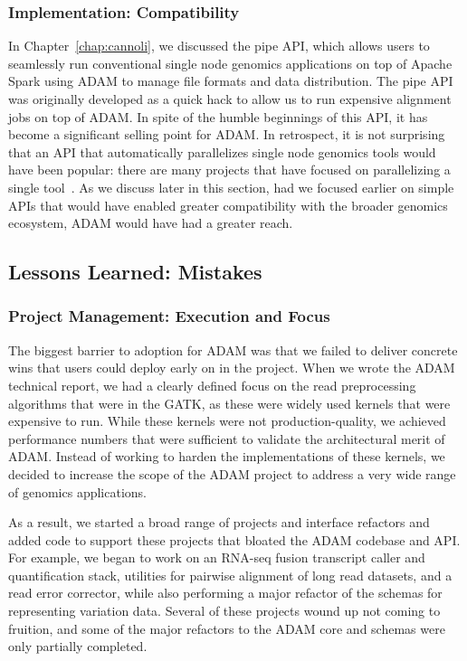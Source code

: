 \documentclass[phd]{ucbthesis}
\begin{document}
\subsubsection{Implementation: Compatibility}
\label{sec:win-compatibility}

In Chapter~\ref{chap:cannoli}, we discussed the pipe API, which allows users to
seamlessly run conventional single node genomics applications on top of Apache
Spark using ADAM to manage file formats and data distribution. The pipe API was
originally developed as a quick hack to allow us to run expensive alignment jobs
on top of ADAM. In spite of the humble beginnings of this API, it has become a
significant selling point for ADAM. In retrospect, it is not surprising that
an API that automatically parallelizes single node genomics tools would have
been popular: there are many projects that have focused on parallelizing a
single tool~\cite{abuin15, decap15, langmead09crossbow, pireddu11, schatz09}.
As we discuss later in this section, had we focused earlier on simple APIs that
would have enabled greater compatibility with the broader genomics ecosystem,
ADAM would have had a greater reach.

\subsection{Lessons Learned: Mistakes}
\label{sec:mistakes}

\subsubsection{Project Management: Execution and Focus}
\label{sec:fail-execution-and-focus}

The biggest barrier to adoption for ADAM was that we failed to deliver concrete
wins that users could deploy early on in the project. When we wrote the ADAM
technical report, we had a clearly defined focus on the read preprocessing
algorithms that were in the GATK, as these were widely used kernels that were
expensive to run. While these kernels were not production-quality, we achieved
performance numbers that were sufficient to validate the architectural merit of
ADAM. Instead of working to harden the implementations of these kernels, we
decided to increase the scope of the ADAM project to address a very wide range of
genomics applications.

As a result, we started a broad range of projects and interface refactors and
added code to support these projects that bloated the ADAM codebase and API.
For example, we began to work on an RNA-seq fusion transcript caller and
quantification stack, utilities for pairwise alignment of long read datasets,
and a read error corrector, while also performing a major refactor of the
schemas for representing variation data. Several of these projects wound up not
coming to fruition, and some of the major refactors to the ADAM core and schemas
were only partially completed.
\end{document}

